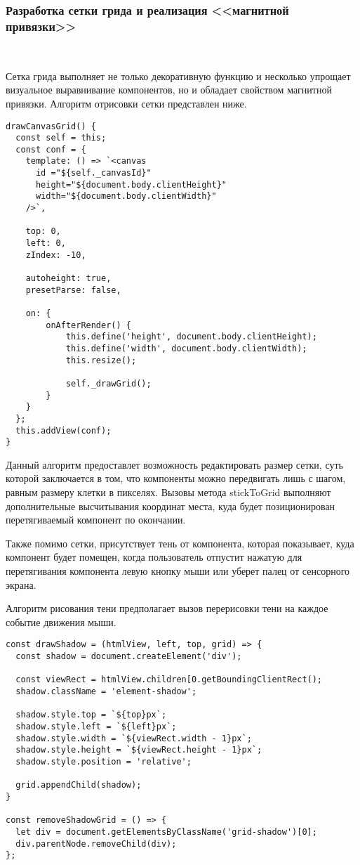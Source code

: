\subsubsection{Разработка сетки грида и реализация <<магнитной привязки>>}
\

Сетка грида выполняет не только декоративную функцию и несколько упрощает визуальное выравнивание компонентов, но и обладает свойством магнитной привязки. Алгоритм отрисовки сетки представлен ниже.

\begin{lstlisting}
drawCanvasGrid() {
  const self = this;
  const conf = {
    template: () => `<canvas
      id ="${self._canvasId}"
      height="${document.body.clientHeight}"
      width="${document.body.clientWidth}"
    />`,

    top: 0,
    left: 0,
    zIndex: -10,

    autoheight: true,
    presetParse: false,
    
    on: {
        onAfterRender() {
            this.define('height', document.body.clientHeight);
            this.define('width', document.body.clientWidth);
            this.resize();

            self._drawGrid();
        }
    }
  };
  this.addView(conf);
}
\end{lstlisting}

Данный алгоритм предоставлет возможность редактировать размер сетки, суть которой заключается в том, что компоненты можно передвигать лишь с шагом, равным размеру клетки в пикселях. Вызовы метода stickToGrid выполняют дополнительные высчитывания координат места, куда будет позиционирован перетягиваемый компонент по окончании.

Также помимо сетки, присутствует тень от компонента, которая показывает, куда компонент будет помещен, когда пользователь отпустит нажатую для перетягивания компонента левую кнопку мыши или уберет палец от сенсорного экрана.

Алгоритм рисования тени предполагает вызов перерисовки тени на каждое событие движения мыши.

\begin{lstlisting}
const drawShadow = (htmlView, left, top, grid) => {
  const shadow = document.createElement('div');

  const viewRect = htmlView.children[0.getBoundingClientRect();
  shadow.className = 'element-shadow';

  shadow.style.top = `${top}px`;
  shadow.style.left = `${left}px`;
  shadow.style.width = `${viewRect.width - 1}px`;
  shadow.style.height = `${viewRect.height - 1}px`;
  shadow.style.position = 'relative';

  grid.appendChild(shadow);
}

const removeShadowGrid = () => {
  let div = document.getElementsByClassName('grid-shadow')[0];
  div.parentNode.removeChild(div);
};
\end{lstlisting}

